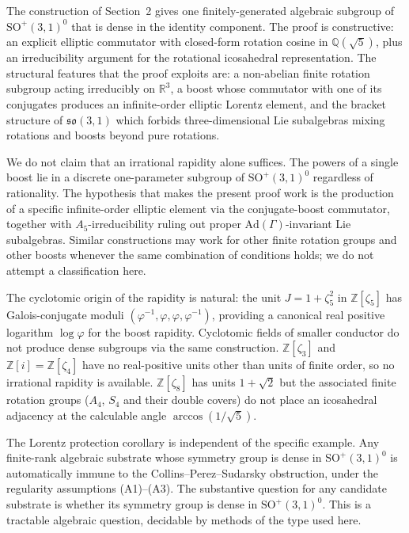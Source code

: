 \documentclass[11pt]{article}
\theoremstyle{remark}
\begin{document}
The construction of Section~2 gives one finitely-generated
algebraic subgroup of $\mathrm{SO}^+(3,1)^0$ that is dense in the
identity component. The proof is
constructive: an explicit elliptic commutator with closed-form
rotation cosine in $\mathbb{Q}(\sqrt{5})$, plus an irreducibility
argument for the rotational icosahedral representation. The structural
features that the proof exploits are: a non-abelian finite rotation
subgroup acting irreducibly on $\mathbb{R}^3$, a boost whose
commutator with one of its conjugates produces an infinite-order
elliptic Lorentz element, and the bracket structure of
$\mathfrak{so}(3,1)$ which forbids three-dimensional Lie subalgebras
mixing rotations and boosts beyond pure rotations.

We do not claim that an irrational rapidity alone suffices. The
powers of a single boost lie in a discrete one-parameter subgroup of
$\mathrm{SO}^+(3,1)^0$ regardless of rationality. The hypothesis that
makes the present proof work is the production of a specific
infinite-order elliptic element via the conjugate-boost commutator,
together with $A_5$-irreducibility ruling out proper
$\mathrm{Ad}(\Gamma)$-invariant Lie subalgebras. Similar constructions
may work for other finite rotation groups and other boosts whenever
the same combination of conditions holds; we do not attempt a
classification here.

The cyclotomic origin of the rapidity is natural: the unit $J = 1 +
\zeta_5^2$ in $\mathbb{Z}[\zeta_5]$ has Galois-conjugate moduli
$(\varphi^{-1}, \varphi, \varphi, \varphi^{-1})$, providing a
canonical real positive logarithm $\log\varphi$ for the boost rapidity.
Cyclotomic fields of smaller conductor do not produce dense subgroups
via the same construction. $\mathbb{Z}[\zeta_3]$ and $\mathbb{Z}[i] =
\mathbb{Z}[\zeta_4]$ have no real-positive units other than units of
finite order, so no irrational rapidity is available. $\mathbb{Z}[\zeta_8]$
has units $1 + \sqrt{2}$ but the associated finite rotation groups
($A_4$, $S_4$ and their double covers) do not place an icosahedral
adjacency at the calculable angle $\arccos(1/\sqrt{5})$.

The Lorentz protection corollary is independent of the specific
example. Any finite-rank algebraic substrate whose symmetry group is
dense in $\mathrm{SO}^+(3,1)^0$ is automatically immune to the
Collins--Perez--Sudarsky obstruction, under the regularity assumptions
(A1)--(A3). The substantive question for any candidate substrate is
whether its symmetry group is dense in $\mathrm{SO}^+(3,1)^0$. This is
a tractable algebraic question, decidable by methods of the type used
here.
\end{document}

